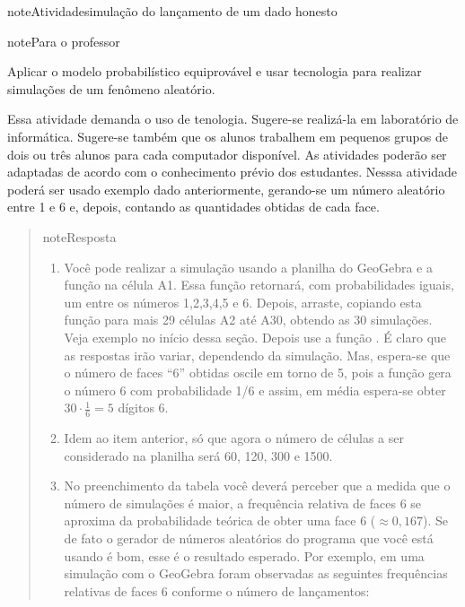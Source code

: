 \begin{sphinxadmonition}{note}{Atividade}{simulação do lançamento de um dado honesto}
\label{ativ-simulacao-dado}

\begin{sphinxadmonition}{note}{Para o professor}

 Aplicar o modelo probabilístico equiprovável e usar tecnologia para realizar simulações de um fenômeno aleatório.

 Essa atividade demanda o uso de tenologia. Sugere-se realizá-la em laboratório de informática. Sugere-se também que os alunos trabalhem em pequenos grupos de dois ou três alunos para cada computador disponível. As atividades poderão ser adaptadas de acordo com o conhecimento prévio dos estudantes. Nesssa atividade poderá ser usado exemplo dado anteriormente, gerando-se um número aleatório entre 1 e 6 e, depois, contando as quantidades obtidas de cada face.
\begin{quote}

\begin{sphinxadmonition}{note}{Resposta}

\begin{enumerate}
\item {} 
Você pode realizar a simulação usando a planilha do GeoGebra e a função  na célula A1. Essa função retornará, com probabilidades iguais, um entre os números 1,2,3,4,5 e 6. Depois, arraste, copiando esta função para mais 29 células A2 até A30, obtendo as 30 simulações. Veja exemplo no início dessa seção. Depois use a função . É claro que as respostas irão variar, dependendo da simulação. Mas, espera-se que o número de faces “6” obtidas oscile em torno de 5, pois a função gera o número 6 com probabilidade 1/6 e assim, em média espera-se obter \(30\cdot \frac{1}{6}=5\) dígitos 6.

\item {} 
Idem ao item anterior, só que agora o número de células a ser considerado na planilha será 60, 120, 300 e 1500.

\item {} 
No preenchimento da tabela você deverá perceber que a medida que o número de simulações é maior, a frequência relativa de faces 6 se aproxima da probabilidade teórica  de obter uma face 6 (\(\approx 0,167\)). Se de fato o gerador de números aleatórios do programa que você está usando é bom, esse é o resultado esperado. Por exemplo, em uma simulação com o GeoGebra foram observadas as seguintes frequências relativas de faces 6 conforme o número de lançamentos:


\end{enumerate}
\end{sphinxadmonition}
\end{quote}
\end{sphinxadmonition}
\end{sphinxadmonition}

